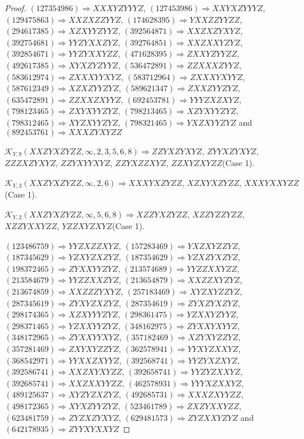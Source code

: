 \documentclass[12pt]{article}
\theoremstyle{plain}
\theoremstyle{definition}
\theoremstyle{remark}
\newcommand{\fancy}[1]{\mathcal{#1}}
\def\K{\fancy{K}}
\begin{document}
\begin{proof}
	$(1 2 7 3 5 4 9 8 6)\Rightarrow XXXYZYYYZ$, $(1 2 7 4 5 3 9 8 6)\Rightarrow XXYXZYYYZ$, $(1 2 9 4 7 5 8 6 3)\Rightarrow XXZXZZYYZ$, $(1 7 4 6 2 8 3 9 5)\Rightarrow YXXZZYYZZ$, $(2 9 4 6 1 7 3 8 5)\Rightarrow XZXYYZYYZ$, $(3 9 2 5 6 4 8 7 1)\Rightarrow XXZXZYXYZ$, $(3 9 2 7 5 4 6 8 1)\Rightarrow YYZYXXZYZ$, $(3 9 2 7 6 4 8 5 1)\Rightarrow XXZXXYZYZ$, $(3 9 2 8 5 4 6 7 1)\Rightarrow YYZYXXYZZ$, $(4 7 1 6 2 8 3 9 5)\Rightarrow ZXXYZYYZZ$, $(4 9 2 6 1 7 3 8 5)\Rightarrow XYXZYZYYZ$, $(5 3 6 4 7 2 8 9 1)\Rightarrow ZZXXXZYYZ$, $(5 8 3 6 1 2 9 7 4)\Rightarrow ZXXXYYXYZ$, $(5 8 3 7 1 2 9 6 4)\Rightarrow ZXXXYXYYZ$, $(5 8 7 6 1 2 3 4 9)\Rightarrow XZXZYYZYZ$, $(5 8 9 6 2 1 3 4 7)\Rightarrow ZXXZYYZYZ$, $(6 3 5 4 7 2 8 9 1)\Rightarrow ZZXXZXYYZ$, $(6 9 2 4 5 3 7 8 1)\Rightarrow YYYZXZXYZ$, $(7 9 8 1 2 3 4 6 5)\Rightarrow ZXYXYYZYZ$, $(7 9 8 2 1 3 4 6 5)\Rightarrow XZYXYYZYZ$, $(7 9 8 3 1 2 4 6 5)\Rightarrow XYZXYYZYZ$, $(7 9 8 3 2 1 4 6 5)\Rightarrow YXZXYYZYZ$ and $(8 9 2 4 5 3 7 6 1)\Rightarrow XXXZYXYZZ$
	
	
	$\K_{Y,9}(XXZYXZYZZ,\infty,2, 3, 5, 6, 8)\Rightarrow $$ZZYXZYXYZ$, $ZYYXZYXYZ$, $ZZZXZYXYZ$, $ZZYXYYXYZ$, $ZZYXZZXYZ$, $ZZXYZXYZZ$(Case 1).
	
	$\K_{Y,3}(XXZYXZYZZ,\infty,2, 6)\Rightarrow $$XXXYXZYZZ$, $XZXYXZYZZ$, $XXXYXXYZZ$(Case 1).
	
	$\K_{Y,2}(XXZYXZYZZ,\infty,5, 6, 8)\Rightarrow $$XZZYXZYZZ$, $XZZYZZYZZ$, $XZZYXXYZZ$, $YZZXYZXYZ$(Case 1).
	
	
	
	$(1 2 3 4 8 6 7 5 9)\Rightarrow YYZXZZXYZ$, $(1 5 7 2 8 3 4 6 9)\Rightarrow YXZXYZZYZ$, $(1 8 7 3 4 5 6 2 9)\Rightarrow YZXYZXZYZ$, $(1 8 7 3 5 4 6 2 9)\Rightarrow YZXZYXZYZ$, $(1 9 8 3 7 2 4 6 5)\Rightarrow ZYXXYYZYZ$, $(2 1 3 5 7 4 6 8 9)\Rightarrow YYZZXXYZZ$, $(2 1 3 5 8 4 6 7 9)\Rightarrow YYZZXXZYZ$, $(2 1 3 6 5 4 8 7 9)\Rightarrow XXZZXYZYZ$, $(2 1 3 6 7 4 8 5 9)\Rightarrow XXZZZYXYZ$, $(2 5 7 1 8 3 4 6 9)\Rightarrow XYZXYZZYZ$, $(2 8 7 3 4 5 6 1 9)\Rightarrow ZYXYZXZYZ$, $(2 8 7 3 5 4 6 1 9)\Rightarrow ZYXZYXZYZ$, $(2 9 8 1 7 4 3 6 5)\Rightarrow XZXYYYZYZ$, $(2 9 8 3 6 1 4 7 5)\Rightarrow YZXXYZYYZ$, $(2 9 8 3 7 1 4 6 5)\Rightarrow YZXXYYZYZ$, $(3 4 8 1 6 2 9 7 5)\Rightarrow ZYXXYXYYZ$, $(3 4 8 1 7 2 9 6 5)\Rightarrow ZYXXYYXYZ$, $(3 5 7 1 8 2 4 6 9)\Rightarrow XZYXYZZYZ$, $(3 5 7 2 8 1 4 6 9)\Rightarrow ZXYXYZZYZ$, $(3 6 2 5 7 8 9 4 1)\Rightarrow YYXYZXXYZ$, $(3 6 8 5 4 2 9 7 1)\Rightarrow YYXXZXYYZ$, $(3 9 2 5 6 8 7 4 1)\Rightarrow YYZYXZXYZ$, $(3 9 2 5 8 6 7 4 1)\Rightarrow XXZXYXYZZ$, $(3 9 2 6 5 8 7 4 1)\Rightarrow YYZYZXXYZ$, $(3 9 2 6 8 5 7 4 1)\Rightarrow XXZXXYYZZ$, $(4 6 2 5 7 8 9 3 1)\Rightarrow YYYXZXXYZ$, $(4 8 9 1 2 5 6 3 7)\Rightarrow XYZYZXZYZ$, $(4 9 2 6 8 5 7 3 1)\Rightarrow XXXZXYYZZ$, $(4 9 8 1 7 2 3 6 5)\Rightarrow XYXZYYZYZ$, $(5 2 3 4 6 1 7 8 9)\Rightarrow ZXZYXXYZZ$, $(6 2 3 4 8 1 7 5 9)\Rightarrow ZYZXZYXYZ$, $(6 2 9 4 8 1 5 7 3)\Rightarrow ZYZXXYZYZ$ and $(6 4 2 1 7 8 9 3 5)\Rightarrow ZYYXYXXYZ$
	

\end{proof}
\end{document}
